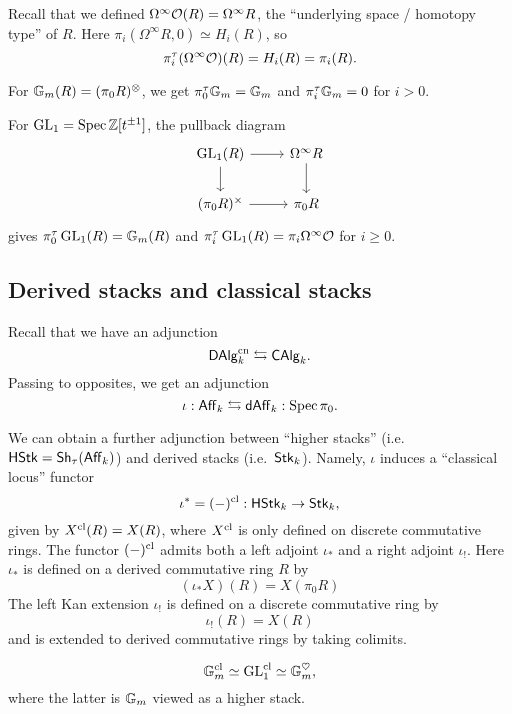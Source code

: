 \documentclass{amsart}
\begin{document}
\begin{ex}
	Recall that we defined $\Omega^\infty \mathcal{O} (R) = \Omega^\infty R$, the ``underlying space / homotopy type'' of $R$.
	Here $\pi_i(\Omega^\infty R, 0) \simeq H_i(R)$, so
	\[
		\pi_i^\tau(\Omega^\infty \mathcal{O})(R) = H_i(R) = \pi_i(R).
	\]
\end{ex}

\begin{ex}
	For $\mathbb{G}_m(R) = (\pi_0 R)^\otimes$, we get $\pi_0^\tau \mathbb{G}_m = \mathbb{G}_m$ and $\pi_i^\tau \mathbb{G}_m = 0$ for $i > 0$.
\end{ex}

\begin{ex}
	For $\operatorname{GL}_1 = \operatorname{Spec} \mathbb{Z}[t^{\pm 1}]$, the pullback diagram
	\[
		\begin{tikzcd}
			\GL_1(R) \rar \dar & \Omega^\infty R \dar \\
			(\pi_0 R)^\times \rar & \pi_0 R
		\end{tikzcd}
	\]
	gives $\pi_0^\tau \operatorname{GL}_1 (R) = \mathbb{G}_m(R)$ and $\pi_i^\tau \operatorname{GL}_1(R) = \pi_i\Omega^\infty \mathcal{O}$ for $i \geq 0$.
\end{ex}


\subsection{Derived stacks and classical stacks}

Recall that we have an adjunction
\[
	\mathsf{DAlg}_k^{\mathrm{cn}} \leftrightarrows \mathsf{CAlg}_k.
\]
Passing to opposites, we get an adjunction
\[
	\iota: \mathsf{Aff}_k \leftrightarrows \mathsf{dAff}_k : \operatorname{Spec} \pi_0.
\]

We can obtain a further adjunction between ``higher stacks'' (i.e.\ $\mathsf{HStk} = \mathsf{Sh}_\tau(\mathsf{Aff}_k)$) and derived stacks (i.e.\ $\mathsf{Stk}_k$).
Namely, $\iota$ induces a ``classical locus'' functor 
\[
	\iota^* = (-)^{\mathrm{cl}} : \mathsf{HStk}_k \to \mathsf{Stk}_k,
\]
given by $X^{\mathrm{cl}}(R) = X(R)$, where $X^{\mathrm{cl}}$ is only defined on discrete commutative rings.
The functor $(-)^{\mathrm{cl}}$ admits both a left adjoint $\iota_*$ and a right adjoint $\iota_!$.
Here $\iota_*$ is defined on a derived commutative ring $R$ by
\[
	(\iota_* X)(R) = X(\pi_0 R)
\]
The left Kan extension $\iota_!$ is defined on a discrete commutative ring by
\[
	\iota_! (R) = X(R) 
\]
and is extended to derived commutative rings by taking colimits.

\begin{ex}
	\[
		\mathbb{G}_m^{\mathrm{cl}} \simeq \operatorname{GL}_1^{\mathrm{cl}} \simeq \mathbb{G}_m^\heartsuit,
	\]
	where the latter is $\mathbb{G}_m$ viewed as a higher stack.
\end{ex}
\end{document}
